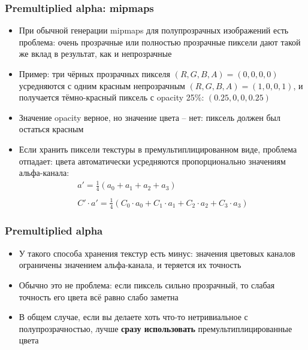 \documentclass[10pt]{beamer}
\begin{document}
\begin{frame}[fragile]
\frametitle{Premultiplied alpha: mipmaps}
\begin{itemize}
\item При обычной генерации mipmaps для полупрозрачных изображений есть проблема: очень прозрачные или полностью прозрачные пиксели дают такой же вклад в результат, как и непрозрачные
\pause
\item Пример: три чёрных прозрачных пикселя \begin{math}(R,G,B,A)=(0,0,0,0)\end{math} усредняются с одним красным непрозрачным \begin{math}(R,G,B,A)=(1,0,0,1)\end{math}, и получается тёмно-красный пиксель с opacity 25\%: \begin{math}(0.25,0,0,0.25)\end{math}
\pause
\item Значение opacity верное, но значение цвета -- нет: пиксель должен был остаться красным
\pause
\item Если хранить пиксели текстуры в премультиплицированном виде, проблема отпадает: цвета автоматически усредняются пропорционально значениям альфа-канала:
\begin{equation*}
\begin{matrix}
a' = \frac{1}{4}(a_0+a_1+a_2+a_3) \\
\\
C'\cdot a' = \frac{1}{4}(C_0\cdot a_0+C_1\cdot a_1+C_2\cdot a_2+C_3\cdot a_3)
\end{matrix}
\end{equation*}
\end{itemize}
\end{frame}

\begin{frame}[fragile]
\frametitle{Premultiplied alpha}
\begin{itemize}
\item У такого способа хранения текстур есть минус: значения цветовых каналов ограничены значением альфа-канала, и теряется их точность
\pause
\item Обычно это не проблема: если пиксель сильно прозрачный, то слабая точность его цвета всё равно слабо заметна
\pause
\item В общем случае, если вы делаете хоть что-то нетривиальное с полупрозрачностью, лучше \textbf{сразу использовать} премультиплицированные цвета
\end{itemize}
\end{frame}
\end{document}

